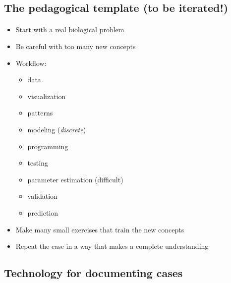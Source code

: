 \documentclass[%
twoside,                 %
final,                   %
10pt]{article}
\begin{document}
\noindent




\subsection*{The pedagogical template (to be iterated!)}


\paragraph{}
\begin{itemize}
 \item Start with a real biological problem

 \item Be careful with too many new concepts

 \item Workflow:
\begin{itemize}

  \item data

  \item visualization

  \item patterns

  \item modeling (\emph{discrete})

  \item programming

  \item testing

  \item parameter estimation (difficult)

  \item validation

  \item prediction

\end{itemize}

\noindent
 \item Make many small exercises that train the new concepts

 \item Repeat the case in a way that makes a complete understanding
\end{itemize}

\noindent



\subsection*{Technology for documenting cases}
\end{document}
